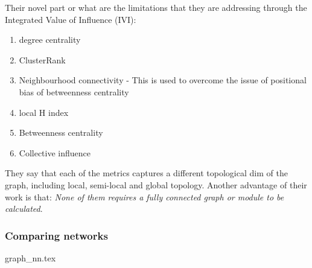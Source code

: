 Their novel part or what are the limitations that they are addressing through the Integrated Value of Influence (IVI):

\begin{enumerate}
    \item degree centrality 
    \item ClusterRank
    \item Neighbourhood connectivity - This is used to overcome the issue of positional bias of betweenness centrality
    \item local H index
    \item Betweenness centrality  
    \item Collective influence 
\end{enumerate}


They say that each of the metrics captures a different topological dim of the graph, including local, semi-local and global topology. Another advantage of their work is that: \textit{None of them requires a fully connected graph or module to be calculated}.

\subsubsection{Comparing networks}


{graph_nn.tex}

\newpage


 


